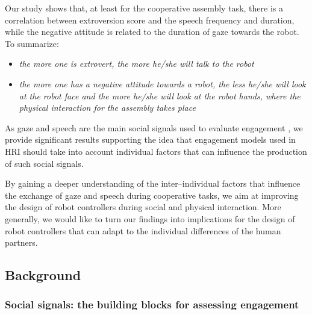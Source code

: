 Our study shows that, at least for the cooperative assembly task, there is a correlation between extroversion score and the speech frequency and duration, while the negative attitude is related to the duration of gaze towards the robot. To summarize:
\begin{itemize}
\item \emph{the more one is extrovert, the more he/she will talk to the robot}
\item \emph{the more one has a negative attitude towards a robot, the less he/she will look at the robot face and the more he/she will look at the robot hands, where the physical interaction for the assembly takes place}
\end{itemize}

As gaze and speech are the main social signals used to evaluate engagement \cite{rich2010recognizing}, we provide significant results supporting the idea that engagement models used in HRI should take into account individual factors that can influence the production of such social signals.

By gaining a deeper understanding of the inter--individual factors that influence the exchange of gaze and speech during cooperative tasks, we aim at improving the design of robot controllers during social and physical interaction.
More generally, we would like to turn our findings into implications for the design of robot controllers that can adapt to the individual differences of the human partners.




\subsection{Background}\label{sec:background}



\subsubsection{Social signals: the building blocks for assessing engagement}




